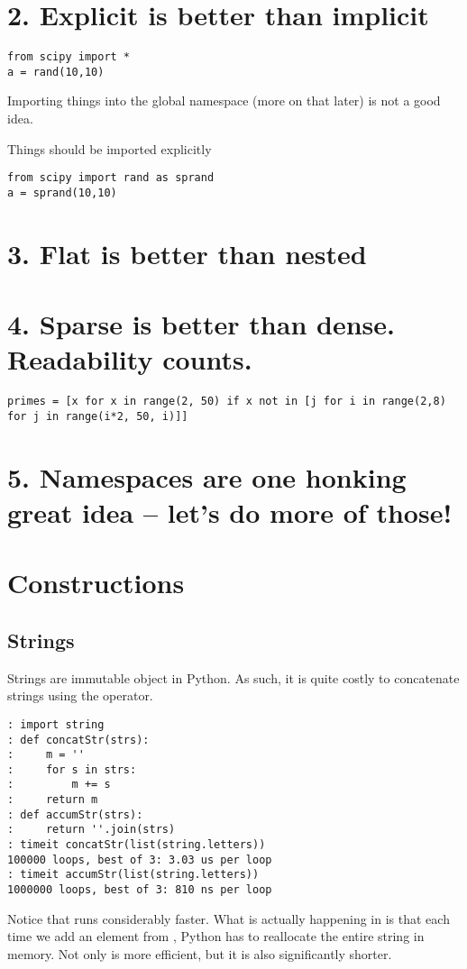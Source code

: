 \section*{2. Explicit is better than implicit}
\begin{lstlisting}
from scipy import *
a = rand(10,10)
\end{lstlisting}

Importing things into the global namespace (more on that later) is not a good idea.

Things should be imported explicitly
\begin{lstlisting}
from scipy import rand as sprand
a = sprand(10,10)
\end{lstlisting}

\section*{3. Flat is better than nested}

\section*{4. Sparse is better than dense. Readability counts.}
\begin{lstlisting}
primes = [x for x in range(2, 50) if x not in [j for i in range(2,8) for j in range(i*2, 50, i)]]
\end{lstlisting}



\section*{5. Namespaces are one honking great idea -- let's do more of those!}

\section*{Constructions}

\subsection*{Strings}
Strings are immutable object in Python.  As such, it is quite costly to concatenate strings using the \li{+} operator.
\begin{lstlisting}
: import string
: def concatStr(strs):
:     m = ''
:     for s in strs:
:         m += s
:     return m
: def accumStr(strs):
:     return ''.join(strs)
: timeit concatStr(list(string.letters))
100000 loops, best of 3: 3.03 us per loop
: timeit accumStr(list(string.letters))
1000000 loops, best of 3: 810 ns per loop
\end{lstlisting}
Notice that  runs considerably faster.  What is actually happening in  is that each time we add an element from , Python has to reallocate the entire string in memory.  Not only is  more efficient, but it is also significantly shorter.

